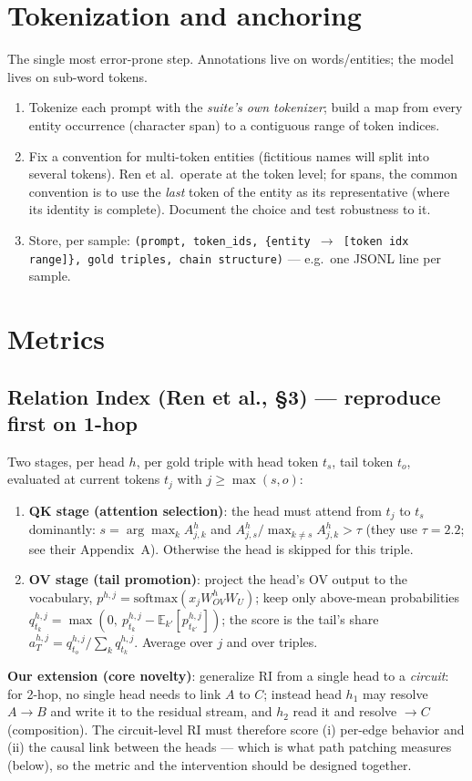 \documentclass[11pt]{article}
\begin{document}
\section{Tokenization and anchoring}
The single most error-prone step. Annotations live on words/entities; the model lives on sub-word tokens.
\begin{enumerate}[itemsep=2pt]
  \item Tokenize each prompt with the \emph{suite's own tokenizer}; build a map from every entity occurrence (character span) to a contiguous range of token indices.
  \item Fix a convention for multi-token entities (fictitious names will split into several tokens). Ren et al.\ operate at the token level; for spans, the common convention is to use the \emph{last} token of the entity as its representative (where its identity is complete). Document the choice and test robustness to it.
  \item Store, per sample: \texttt{(prompt, token\_ids, \{entity $\to$ [token idx range]\}, gold triples, chain structure)} --- e.g.\ one JSONL line per sample.
\end{enumerate}

\section{Metrics}
\subsection{Relation Index (Ren et al., \S3) --- reproduce first on 1-hop}
Two stages, per head $h$, per gold triple with head token $t_s$, tail token $t_o$, evaluated at current tokens $t_j$ with $j \geq \max(s,o)$:
\begin{enumerate}[itemsep=2pt]
  \item \textbf{QK stage (attention selection)}: the head must attend from $t_j$ to $t_s$ dominantly: $s = \arg\max_k A^h_{j,k}$ and $A^h_{j,s} / \max_{k \neq s} A^h_{j,k} > \tau$ (they use $\tau = 2.2$; see their Appendix~A). Otherwise the head is skipped for this triple.
  \item \textbf{OV stage (tail promotion)}: project the head's OV output to the vocabulary, $p^{h,j} = \mathrm{softmax}(x_j W^h_{OV} W_U)$; keep only above-mean probabilities $q^{h,j}_{t_k} = \max(0,\ p^{h,j}_{t_k} - \mathbb{E}_{k'}[p^{h,j}_{t_{k'}}])$; the score is the tail's share $a^{h,j}_T = q^{h,j}_{t_o} / \sum_k q^{h,j}_{t_k}$. Average over $j$ and over triples.
\end{enumerate}
\textbf{Our extension (core novelty)}: generalize RI from a single head to a \emph{circuit}: for 2-hop, no single head needs to link $A$ to $C$; instead head $h_1$ may resolve $A\!\to\!B$ and write it to the residual stream, and $h_2$ read it and resolve $\to C$ (composition). The circuit-level RI must therefore score (i) per-edge behavior and (ii) the causal link between the heads --- which is what path patching measures (below), so the metric and the intervention should be designed together.
\end{document}
